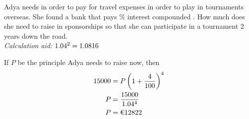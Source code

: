 

\question[3]  Adya needs \texteuro{\vbone} in order to pay for travel expenses in order to 
play in tournaments overseas. She found a bank that pays \vbtwo\% interest compounded \vbfour. 
How much does she need to raise in sponsorships so that she can participate in a 
tournament 2 years down the road.\\
\textit{Calculation aid: $1.04^2=1.0816$}


\watchout

\ifprintanswers
 
\fi 

\begin{solution}[\halfpage]
  If $P$ be the principle Adya needs to raise now, then 
  \begin{align}
    \vbone &= P\left(1+\dfrac{\vbtwo}{100}\right)^{\vbfive} \\
    P      &= \dfrac{\vbone}{\vbthree ^ \vbfive} \\
    P      &= \text{\texteuro{\vbseven}}
  \end{align}
\end{solution}

